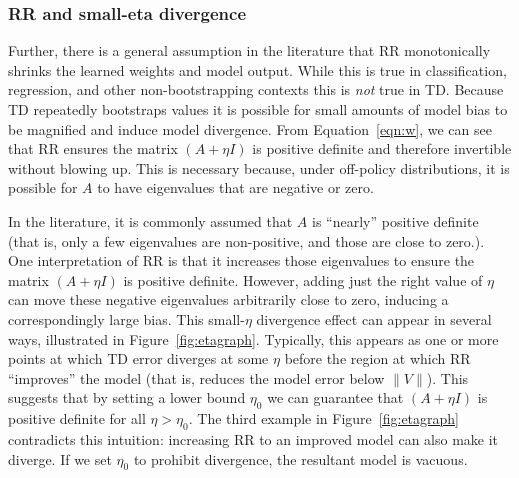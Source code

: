 \documentclass[11pt]{article}
\begin{document}

\subsubsection{RR and small-eta divergence}
Further, there is a general assumption in the literature that RR monotonically shrinks the learned weights and model output. While this is true in classification, regression, and other non-bootstrapping contexts this is \emph{not} true in TD. Because TD repeatedly bootstraps values it is possible for small amounts of model bias to be magnified and induce model divergence.
From Equation~\ref{eqn:w}, we can see that RR ensures the matrix $(A + \eta I)$ is positive definite and therefore invertible without blowing up. This is necessary because, under off-policy distributions, it is possible for $A$ to have eigenvalues that are negative or zero.

In the literature, it is commonly assumed that $A$ is ``nearly'' positive definite (that is, only a few eigenvalues are non-positive, and those are close to zero.). One interpretation of RR is that it increases those eigenvalues to ensure the matrix $(A + \eta I)$ is positive definite. However, adding just the right value of $\eta$ can move these negative eigenvalues arbitrarily close to zero, inducing a correspondingly large bias.
This small-$\eta$ divergence effect can appear in several ways, illustrated in Figure~\ref{fig:etagraph}. Typically, this appears as one or more points at which TD error diverges at some $\eta$ before the region at which RR ``improves'' the model (that is, reduces the model error below $\|V\|$). This suggests that by setting a lower bound $\eta_0$ we can guarantee that $(A + \eta I)$ is positive definite for all $\eta > \eta_0$. The third example in Figure~\ref{fig:etagraph} contradicts this intuition: increasing RR to an improved model can also make it diverge. If we set $\eta_0$ to prohibit divergence, the resultant model is vacuous.
\end{document}
